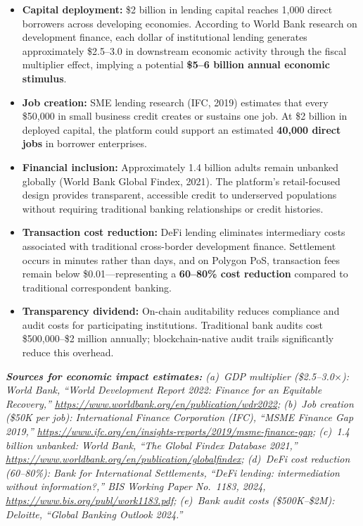 \documentclass[11pt,a4paper]{article}
\begin{document}
\begin{itemize}[noitemsep]
\item \textbf{Capital deployment:} \$2 billion in lending capital reaches 1,000 direct borrowers across developing economies. According to World Bank research on development finance, each dollar of institutional lending generates approximately \$2.5--3.0 in downstream economic activity through the fiscal multiplier effect, implying a potential \textbf{\$5--6 billion annual economic stimulus}.
\item \textbf{Job creation:} SME lending research (IFC, 2019) estimates that every \$50,000 in small business credit creates or sustains one job. At \$2 billion in deployed capital, the platform could support an estimated \textbf{40,000 direct jobs} in borrower enterprises.
\item \textbf{Financial inclusion:} Approximately 1.4 billion adults remain unbanked globally (World Bank Global Findex, 2021). The platform's retail-focused design provides transparent, accessible credit to underserved populations without requiring traditional banking relationships or credit histories.
\item \textbf{Transaction cost reduction:} DeFi lending eliminates intermediary costs associated with traditional cross-border development finance. Settlement occurs in minutes rather than days, and on Polygon PoS, transaction fees remain below \$0.01---representing a \textbf{60--80\% cost reduction} compared to traditional correspondent banking.
\item \textbf{Transparency dividend:} On-chain auditability reduces compliance and audit costs for participating institutions. Traditional bank audits cost \$500,000--\$2 million annually; blockchain-native audit trails significantly reduce this overhead.
\end{itemize}

\vspace{4pt}
\noindent\textit{\small\textbf{Sources for economic impact estimates:}
(a)~GDP multiplier (\$2.5--3.0$\times$): World Bank, ``World Development Report 2022: Finance for an Equitable Recovery,'' \url{https://www.worldbank.org/en/publication/wdr2022};
(b)~Job creation (\$50K per job): International Finance Corporation (IFC), ``MSME Finance Gap 2019,'' \url{https://www.ifc.org/en/insights-reports/2019/msme-finance-gap};
(c)~1.4 billion unbanked: World Bank, ``The Global Findex Database 2021,'' \url{https://www.worldbank.org/en/publication/globalfindex};
(d)~DeFi cost reduction (60--80\%): Bank for International Settlements, ``DeFi lending: intermediation without information?,'' BIS Working Paper No.~1183, 2024, \url{https://www.bis.org/publ/work1183.pdf};
(e)~Bank audit costs (\$500K--\$2M): Deloitte, ``Global Banking Outlook 2024.''}
\end{document}
